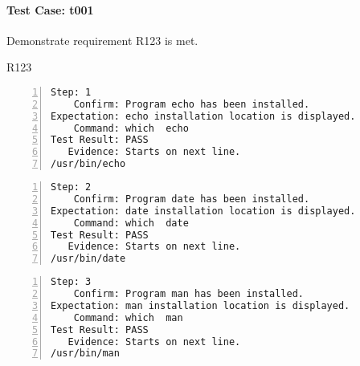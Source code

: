 \paragraph{Test Case: t001}
\begin{description}[align=right,leftmargin=*,labelindent=3cm]
\item[Purpose:] Demonstrate requirement R123 is met.
\item[Requirement:] R123
\end{description}
\begin{lstlisting}[numbers=left]
       Step: 1
    Confirm: Program echo has been installed.
Expectation: echo installation location is displayed.
    Command: which  echo 
Test Result: PASS
   Evidence: Starts on next line.
/usr/bin/echo

\end{lstlisting}
\begin{lstlisting}[numbers=left]
       Step: 2
    Confirm: Program date has been installed.
Expectation: date installation location is displayed.
    Command: which  date 
Test Result: PASS
   Evidence: Starts on next line.
/usr/bin/date

\end{lstlisting}
\begin{lstlisting}[numbers=left]
       Step: 3
    Confirm: Program man has been installed.
Expectation: man installation location is displayed.
    Command: which  man 
Test Result: PASS
   Evidence: Starts on next line.
/usr/bin/man

\end{lstlisting}
